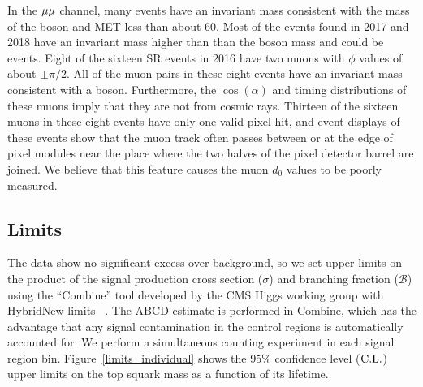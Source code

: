 In the ${\mu}{\mu}$ channel, many events have an invariant mass consistent with the mass of the \PZ boson and MET less than about 60\GeV. Most of the events found in 2017 and 2018 have an invariant mass higher than than the \PZ boson mass and could be \ttbar events. Eight of the sixteen SR events in 2016 have two muons with $\phi$ values of about $\pm\pi/2$. All of the muon pairs in these eight events have an invariant mass consistent with a \PZ boson. Furthermore, the $\cos(\alpha)$ and timing distributions of these muons imply that they are not from cosmic rays. Thirteen of the sixteen muons in these eight events have only one valid pixel hit, and event displays of these events show that the muon track often passes between or at the edge of pixel modules near the place where the two halves of the pixel detector barrel are joined. We believe that this feature causes the muon $d_0$ values to be poorly measured.

\subsection{Limits}

The data show no significant excess over background, so we set upper limits on the product of the signal production cross section ($\sigma$) and branching fraction ($\mathcal{B}$) using the ``Combine'' tool developed by the CMS Higgs working group with HybridNew limits ~\cite{Junk_CLS,Read_CLS,Cowan:2010js,CMS-NOTE-2011-005}. The ABCD estimate is performed in Combine, which has the advantage that any signal contamination in the control regions is automatically accounted for. We perform a simultaneous counting experiment in each signal region bin. Figure~\ref{limits_individual} shows the 95\% confidence level ($\text{C.L.}$) upper limits on the top squark mass as a function of its lifetime.

